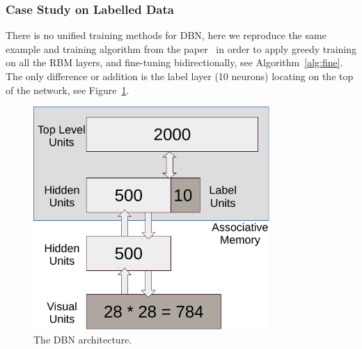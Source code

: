 	\subsubsection{Case Study on Labelled Data}
	There is no unified training methods for DBN, here we reproduce the same example and training algorithm from the paper~\cite{hinton2006fast} in order to apply greedy training on all the RBM layers, and fine-tuning bidirectionally, see Algorithm~\ref{alg:fine}.
	The only difference or addition is the label layer (10 neurons) locating on the top of the network, see Figure~\ref{Fig:case}.
		\begin{figure}[hbt]
				\centering
				\includegraphics[width=0.8\textwidth]{pics_sdbn/DBN.pdf}
				\caption{The DBN architecture.} 
				\label{Fig:case}
		\end{figure}
		

